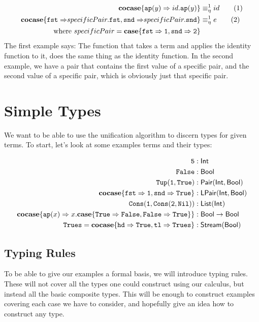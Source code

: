 \documentclass[twoside,12pt,a4paper]{article}
\begin{document}
\begin{example}
    \begin{align*}
        \textbf{cocase}\{\texttt{ap}(y)\Rightarrow id.\texttt{ap}(y)\}&\equiv_{\eta}^1 id\tag{1}\\
        \textbf{cocase}\{\mathtt{fst\Rightarrow} specificPair.\mathtt{fst}, \mathtt{snd\Rightarrow}specificPair.\mathtt{snd}\}&\equiv_{\eta}^1 e  \tag{2}\\      
        \text{where } specificPair = \textbf{case}\{\mathtt{fst\Rightarrow 1, snd\Rightarrow 2}\}
    \end{align*} %
    The first example says: The function that takes a term and applies the identity function to it, does the same thing as the identity function.
    In the second example, we have a pair that contains the first value of a specific pair, and the second value of a specific pair, which is obviously just that specific pair.    
\end{example}    
    
\section{Simple Types}\label{sec:types}

We want to be able to use the unification algorithm to discern types for given terms. 
To start, let's look at some examples terms and their types:

\begin{example}
    \begin{align*}
        \mathtt{5}&: \mathsf{Int}\\
        \mathtt{False}&: \mathsf{Bool}\\
        \mathtt{Tup(1,True)}&: \mathsf{Pair(Int, Bool)}\\
        \textbf{cocase}\{\mathtt{fst \Rightarrow 1, snd\Rightarrow True}\}&: \mathsf{LPair(Int, Bool)}\\
        \mathtt{Cons(1, Cons(2, Nil))}&: \mathsf{List(Int)}\\
        \textbf{cocase}\{\texttt{ap}(x)\Rightarrow x.\textbf{case}\{\mathtt{True\Rightarrow False, False \Rightarrow True}\}\}&: \mathsf{Bool \rightarrow Bool}\\
        \mathtt{Trues} = \textbf{cocase}\{\mathtt{hd \Rightarrow True, tl \Rightarrow Trues}\}&: \mathsf{Stream(Bool)}\\
    \end{align*}    
\end{example}

\subsection{Typing Rules}
To be able to give our examples a formal basis, we will introduce typing rules. %
These will not cover all the types one could construct using our calculus, 
but instead all the basic composite types.
This will be enough to construct examples covering each case we have to consider,
and hopefully give an idea how to construct any type.
\end{document}
